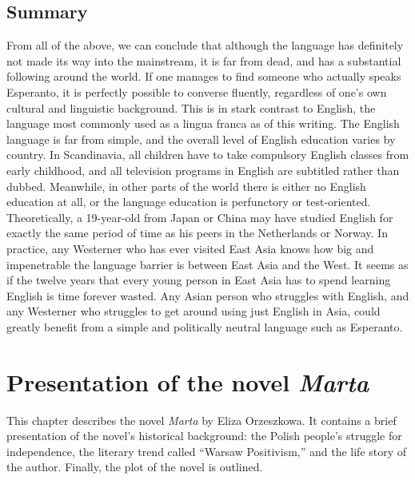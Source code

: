 \section{Summary}
From all of the above, we can conclude that although the language has definitely not made its way into the mainstream, it is far from dead, and has a substantial following around the world.
If one manages to find someone who actually speaks Esperanto, it is perfectly possible to converse fluently, regardless of one's own cultural and linguistic background.
This is in stark contrast to English, the language most commonly used as a lingua franca as of this writing.
The English language is far from simple, and the overall level of English education varies by country.
In Scandinavia, all children have to take compulsory English classes from early childhood, and all television programs in English are subtitled rather than dubbed.
Meanwhile, in other parts of the world there is either no English education at all, or the language education is perfunctory or test-oriented.
Theoretically, a 19-year-old from Japan or China may have studied English for exactly the same period of time as his peers in the Netherlands or Norway.
In practice, any Westerner who has ever visited East Asia knows how big and impenetrable the language barrier is between East Asia and the West.
It seems as if the twelve years that every young person in East Asia has to spend learning English is time forever wasted.
Any Asian person who struggles with English, and any Westerner who struggles to get around using just English in Asia, could greatly benefit from a simple and politically neutral language such as Esperanto.


\chapter{Presentation of the novel \textit{Marta}}
This chapter describes the novel \textit{Marta} by Eliza Orzeszkowa.
It contains a brief presentation of the novel's historical background: the Polish people's struggle for independence, the literary trend called ``Warsaw Positivism,'' and the life story of the author.
Finally, the plot of the novel is outlined.

